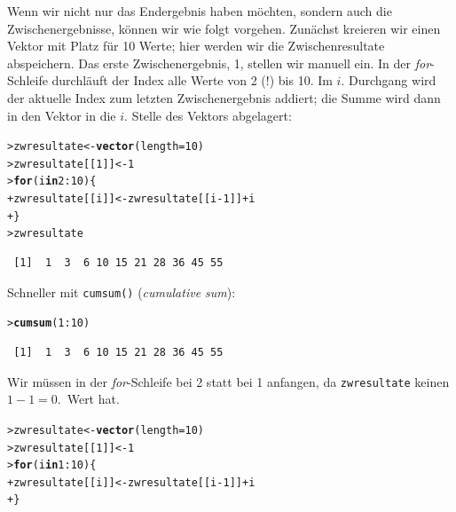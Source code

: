 \documentclass[oneside, 10pt]{book}\usepackage[]{graphicx}\usepackage[]{xcolor}
\makeatletter
\newcommand{\hlnum}[1]{\textcolor[rgb]{0.686,0.059,0.569}{#1}}%
\newcommand{\hlopt}[1]{\textcolor[rgb]{0,0,0}{#1}}%
\newcommand{\hlstd}[1]{\textcolor[rgb]{0.345,0.345,0.345}{#1}}%
\newcommand{\hlkwa}[1]{\textcolor[rgb]{0.161,0.373,0.58}{\textbf{#1}}}%
\newcommand{\hlkwb}[1]{\textcolor[rgb]{0.69,0.353,0.396}{#1}}%
\newcommand{\hlkwc}[1]{\textcolor[rgb]{0.333,0.667,0.333}{#1}}%
\newcommand{\hlkwd}[1]{\textcolor[rgb]{0.737,0.353,0.396}{\textbf{#1}}}%
\newenvironment{kframe}{%
 \def\at@end@of@kframe{}%
 \ifinner\ifhmode%
  \def\at@end@of@kframe{\end{minipage}}%
  \begin{minipage}{\columnwidth}%
 \fi\fi%
 \def\FrameCommand##1{\hskip\@totalleftmargin \hskip-\fboxsep
 \colorbox{shadecolor}{##1}\hskip-\fboxsep
     \hskip-\linewidth \hskip-\@totalleftmargin \hskip\columnwidth}%
 \MakeFramed {\advance\hsize-\width
   \@totalleftmargin\z@ \linewidth\hsize
   \@setminipage}}%
 {\par\unskip\endMakeFramed%
 \at@end@of@kframe}
\newenvironment{knitrout}{}{} %
\makeatother
\begin{document}
\begin{framed}
Wenn wir nicht nur das Endergebnis haben möchten, sondern auch die Zwischenergebnisse,
können wir wie folgt vorgehen.
Zunächst kreieren wir einen Vektor mit Platz für 10 Werte; hier werden wir die
Zwischenresultate abspeichern. Das erste Zwischenergebnis, 1, stellen wir manuell
ein. In der \textit{for}-Schleife durchläuft der Index alle Werte von 2 (!) bis 10.
Im $i.$ Durchgang wird der aktuelle Index zum letzten Zwischenergebnis addiert;
die Summe wird dann in den Vektor in die $i.$ Stelle des Vektors abgelagert:
\begin{knitrout}
\color{fgcolor}\begin{kframe}
\begin{alltt}
\hlstd{> }\hlstd{zwresultate} \hlkwb{<-} \hlkwd{vector}\hlstd{(}\hlkwc{length} \hlstd{=} \hlnum{10}\hlstd{)}
\hlstd{> }\hlstd{zwresultate[[}\hlnum{1}\hlstd{]]} \hlkwb{<-} \hlnum{1}
\hlstd{> }\hlkwa{for} \hlstd{(i} \hlkwa{in} \hlnum{2}\hlopt{:}\hlnum{10}\hlstd{) \{}
\hlstd{+ }  \hlstd{zwresultate[[i]]} \hlkwb{<-} \hlstd{zwresultate[[i}\hlopt{-}\hlnum{1}\hlstd{]]} \hlopt{+} \hlstd{i}
\hlstd{+ }\hlstd{\}}
\hlstd{> }\hlstd{zwresultate}
\end{alltt}
\begin{verbatim}
 [1]  1  3  6 10 15 21 28 36 45 55
\end{verbatim}
\end{kframe}
\end{knitrout}

Schneller mit \texttt{cumsum()} (\textit{cumulative sum}):
\begin{knitrout}
\color{fgcolor}\begin{kframe}
\begin{alltt}
\hlstd{> }\hlkwd{cumsum}\hlstd{(}\hlnum{1}\hlopt{:}\hlnum{10}\hlstd{)}
\end{alltt}
\begin{verbatim}
 [1]  1  3  6 10 15 21 28 36 45 55
\end{verbatim}
\end{kframe}
\end{knitrout}

Wir müssen in der \textit{for}-Schleife bei 2 statt bei 1 anfangen,
da \texttt{zwresultate} keinen $1-1 = 0.$\ Wert hat.
\begin{knitrout}
\color{fgcolor}\begin{kframe}
\begin{alltt}
\hlstd{> }\hlstd{zwresultate} \hlkwb{<-} \hlkwd{vector}\hlstd{(}\hlkwc{length} \hlstd{=} \hlnum{10}\hlstd{)}
\hlstd{> }\hlstd{zwresultate[[}\hlnum{1}\hlstd{]]} \hlkwb{<-} \hlnum{1}
\hlstd{> }\hlkwa{for} \hlstd{(i} \hlkwa{in} \hlnum{1}\hlopt{:}\hlnum{10}\hlstd{) \{}
\hlstd{+ }  \hlstd{zwresultate[[i]]} \hlkwb{<-} \hlstd{zwresultate[[i}\hlopt{-}\hlnum{1}\hlstd{]]} \hlopt{+} \hlstd{i}
\hlstd{+ }\hlstd{\}}
\end{alltt}



\end{kframe}
\end{knitrout}
\end{framed}
\end{document}
